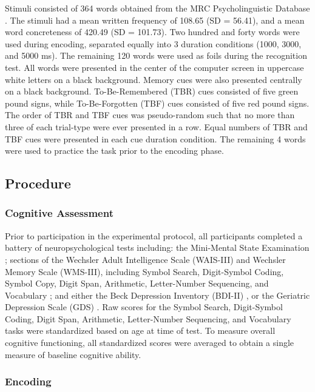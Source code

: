 \documentclass[man]{apa6}
\begin{document}
Stimuli consisted of 364 words obtained from the MRC Psycholinguistic Database \parencite{coltheart1981}. The stimuli had a mean \textcite[]{kuvcera.nelson1967} written frequency of 108.65 (SD = 56.41), and a mean word concreteness \parencite{spreen.schulz1966,gilhooly.logie1980} of 420.49 (SD = 101.73). Two hundred and forty words were used during encoding, separated equally into 3 duration conditions (1000, 3000, and 5000 ms). The remaining 120 words were used as foils during the recognition test. All words were presented in the center of the computer screen in uppercase white letters on a black background. Memory cues were also presented centrally on a black background. To-Be-Remembered (TBR) cues consisted of five green pound signs, while To-Be-Forgotten (TBF) cues consisted of five red pound signs. The order of TBR and TBF cues was pseudo-random such that no more than three of each trial-type were ever presented in a row. Equal numbers of TBR and TBF cues were presented in each cue duration condition. The remaining 4 words were used to practice the task prior to the encoding phase.

\subsection*{Procedure}

\subsubsection*{Cognitive Assessment}

Prior to participation in the experimental protocol, all participants completed a battery of neuropsychological tests including: the Mini-Mental State Examination \parencite{folstein.robins.helzer1983mmse}; sections of the Wechsler Adult Intelligence Scale (WAIS-III) and Wechsler Memory Scale (WMS-III), including Symbol Search, Digit-Symbol Coding, Symbol Copy, Digit Span, Arithmetic, Letter-Number Sequencing, and Vocabulary \parencite{wais2008}; and either the Beck Depression Inventory (BDI-II) \parencite{beck.et.al.1996bdi}, or the Geriatric Depression Scale (GDS) \parencite{yesavage.sheikh1986gds}. Raw scores for the Symbol Search, Digit-Symbol Coding, Digit Span, Arithmetic, Letter-Number Sequencing, and Vocabulary tasks were standardized based on age at time of test. To measure overall cognitive functioning, all standardized scores were averaged to obtain a single measure of baseline cognitive ability.

\subsubsection*{Encoding}
\end{document}

